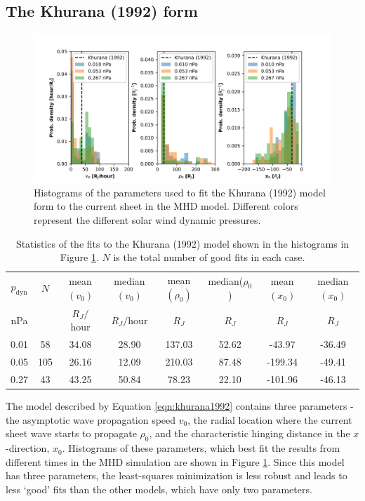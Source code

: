 \subsection{The Khurana (1992) form}
  
\begin{figure}
    \centering
    \includegraphics[width=\textwidth]{images6/comparison_highdynP_khurana.png}
    \caption{Histograms of the parameters used to fit the Khurana (1992) model form to the current sheet in the MHD model. Different colors represent the different solar wind dynamic pressures.}
    \label{fig:comparison-hist-khurana}
\end{figure}

\begin{table}
    \centering
    \begin{tabular}{c|c|c|c|c|c|c|c}
     $p_\text{dyn}$ &      $N$&  mean$(v_0)$&  median$(v_0)$&  mean$(\rho_0)$&    median($\rho_0$)& mean$(x_0)$&  median$(x_0)$\\
     nPa&   &   $R_J/$hour& $R_J/$hour& $R_J$   & $R_J$  &$R_J$  & $R_J$\\
     \hline
     0.01 &  58 &    34.08 &      28.90 &     137.03 &        52.62 &   -43.97 &     -36.49 \\
     0.05 & 105 &    26.16 &      12.09 &     210.03 &        87.48 &  -199.34 &     -49.41 \\
     0.27 &  43 &    43.25 &      50.84 &      78.23 &        22.10 &  -101.96 &     -46.13 \\
    \end{tabular}
    \caption{Statistics of the fits to the Khurana (1992) model shown in the histograms in Figure \protect\ref{fig:comparison-hist-khurana}. $N$ is the total number of good fits in each case.}
    \label{tab:comparison-khurana}
\end{table}

The model described by Equation \ref{eqn:khurana1992} contains three parameters - the asymptotic wave propagation speed $v_0$, the radial location where the current sheet wave starts to propagate $\rho_0$, and the characteristic hinging distance in the $x$-direction, $x_0$. Histograms of these parameters, which best fit the results from different times in the MHD simulation are shown in Figure \ref{fig:comparison-hist-khurana}. Since this model has three parameters, the least-squares minimization is less robust and leads to less `good' fits than the other models, which have only two parameters.

